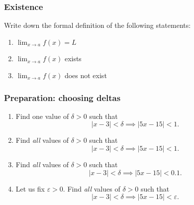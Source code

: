\documentclass[14pt]{beamer}
\begin{document}
	\begin{frame}
		\frametitle{Existence}

		Write down the formal definition of the following statements:

		\vfill
		\begin{enumerate}
			\item $\displaystyle \lim_{x \to a}f(x) = L$
				\vfill

			\item $\displaystyle \lim_{x \to a}f(x)$ exists

				\vfill

			\item $\displaystyle \lim_{x \to a}f(x)$ does not exist
		\end{enumerate}

		\vfill
	\end{frame}


	\begin{frame}[t]
		\frametitle{Preparation: choosing deltas}

		\begin{enumerate}
			\item Find one value of $\delta >0$ such that
				\[
					|x-3|< \delta \implies |5x-15|<1.
				\]

			\item Find \emph{all} values of $\delta >0$ such that
				\[
					|x-3|< \delta \implies |5x-15|<1.
				\]

			\item Find \emph{all} values of $\delta >0$ such that
				\[
					|x-3|< \delta \implies |5x-15|<0.1.
				\]

			\item Let us fix $\varepsilon >0$. Find \emph{all} values of $\delta >0$ such
				that
				\[
					|x-3|< \delta \implies |5x-15|<\varepsilon.
				\]
		\end{enumerate}
	\end{frame}

\end{document}
